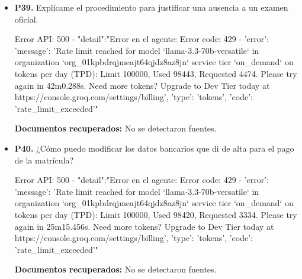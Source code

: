 \documentclass{article}
\begin{document}
\begin{itemize}
  \item \textbf{P39.} Explícame el procedimiento para justificar una ausencia a un examen oficial. \\
    \begin{respuesta_agente}
      Error API: 500 - {"detail":"Error en el agente: Error code: 429 - {'error': {'message': 'Rate limit reached for model `llama-3.3-70b-versatile` in organization `org_01kpbdrqjmeajt64qjdz8az8jn` service tier `on_demand` on tokens per day (TPD): Limit 100000, Used 98443, Requested 4474. Please try again in 42m0.288s. Need more tokens? Upgrade to Dev Tier today at https://console.groq.com/settings/billing', 'type': 'tokens', 'code': 'rate_limit_exceeded'}}"}
    \end{respuesta_agente}
    \vspace{0.2cm}
    \noindent\textbf{Documentos recuperados:} No se detectaron fuentes.

  \item \textbf{P40.} ¿Cómo puedo modificar los datos bancarios que di de alta para el pago de la matrícula? \\
    \begin{respuesta_agente}
      Error API: 500 - {"detail":"Error en el agente: Error code: 429 - {'error': {'message': 'Rate limit reached for model `llama-3.3-70b-versatile` in organization `org_01kpbdrqjmeajt64qjdz8az8jn` service tier `on_demand` on tokens per day (TPD): Limit 100000, Used 98420, Requested 3334. Please try again in 25m15.456s. Need more tokens? Upgrade to Dev Tier today at https://console.groq.com/settings/billing', 'type': 'tokens', 'code': 'rate_limit_exceeded'}}"}
    \end{respuesta_agente}
    \vspace{0.2cm}
    \noindent\textbf{Documentos recuperados:} No se detectaron fuentes.

\end{itemize}
\end{document}
